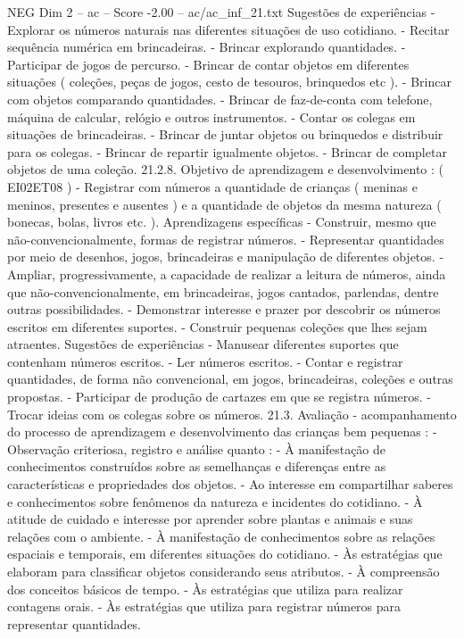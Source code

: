 \begin{textsample}{NEG Dim 2 – ac – Score -2.00 – ac/ac\_inf\_21.txt}
Sugestões de experiências - Explorar os números naturais nas diferentes situações de uso cotidiano. - Recitar sequência numérica em brincadeiras. - Brincar explorando quantidades. - Participar de jogos de percurso. - Brincar de contar objetos em diferentes situações ( coleções, peças de jogos, cesto de tesouros, brinquedos etc ). - Brincar com objetos comparando quantidades. - Brincar de faz-de-conta com telefone, máquina de calcular, relógio e outros instrumentos. - Contar os colegas em situações de brincadeiras. - Brincar de juntar objetos ou brinquedos e distribuir para os colegas. - Brincar de repartir igualmente objetos. - Brincar de completar objetos de uma coleção. 21.2.8.
Objetivo de aprendizagem e desenvolvimento : ( EI02ET08 ) - Registrar com números a quantidade de crianças ( meninas e meninos, presentes e ausentes ) e a quantidade de objetos da mesma natureza ( bonecas, bolas, livros etc. ).
Aprendizagens específicas - Construir, mesmo que não-convencionalmente, formas de registrar números. - Representar quantidades por meio de desenhos, jogos, brincadeiras e manipulação de diferentes objetos. - Ampliar, progressivamente, a capacidade de realizar a leitura de números, ainda que não-convencionalmente, em brincadeiras, jogos cantados, parlendas, dentre outras possibilidades. - Demonstrar interesse e prazer por descobrir os números escritos em diferentes suportes. - Construir pequenas coleções que lhes sejam atraentes.
Sugestões de experiências - Manusear diferentes suportes que contenham números escritos. - Ler números escritos. - Contar e registrar quantidades, de forma não convencional, em jogos, brincadeiras, coleções e outras propostas. - Participar de produção de cartazes em que se registra números. - Trocar ideias com os colegas sobre os números. 21.3.
Avaliação - acompanhamento do processo de aprendizagem e desenvolvimento das crianças bem pequenas : - Observação criteriosa, registro e análise quanto : - À manifestação de conhecimentos construídos sobre as semelhanças e diferenças entre as características e propriedades dos objetos. - Ao interesse em compartilhar saberes e conhecimentos sobre fenômenos da natureza e incidentes do cotidiano. - À atitude de cuidado e interesse por aprender sobre plantas e animais e suas relações com o ambiente. - À manifestação de conhecimentos sobre as relações espaciais e temporais, em diferentes situações do cotidiano. - Às estratégias que elaboram para classificar objetos considerando seus atributos. - À compreensão dos conceitos básicos de tempo. - Às estratégias que utiliza para realizar contagens orais. - Às estratégias que utiliza para registrar números para representar quantidades.

\end{textsample}
